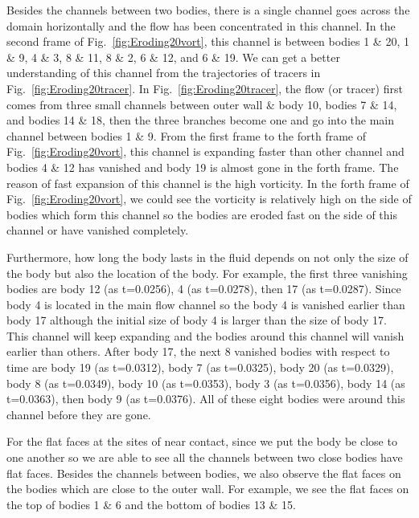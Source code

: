 \documentclass[preprint, 10pt]{elsarticle}
\begin{document}
{\color{red} 
Besides the channels between two bodies, there is a single channel goes
across the domain horizontally and the flow has been concentrated in
this channel.  In the second frame of Fig.~\ref{fig:Eroding20vort}, this
channel is between bodies 1 \& 20, 1 \& 9, 4 \& 3, 8 \& 11, 8 \& 2, 6 \&
12, and 6 \& 19.  We can get a better understanding of this channel from
the trajectories of tracers in Fig.~\ref{fig:Eroding20tracer}.  In Fig.~\ref{fig:Eroding20tracer}, 
the flow (or tracer) first comes from three small channels between outer wall \& body
10, bodies 7 \& 14, and bodies 14 \& 18, then the three branches become
one and go into the main channel between bodies 1 \& 9.  From the first
frame to the forth frame of Fig.~\ref{fig:Eroding20vort}, this channel
is expanding faster than other channel and bodies 4 \& 12 has vanished
and body 19 is almost gone in the forth frame.  The reason of fast
expansion of this channel is the high vorticity.  In the forth frame of
Fig.~\ref{fig:Eroding20vort}, we could see the vorticity is relatively
high on the side of bodies which form this channel so the bodies are
eroded fast on the side of this channel or have vanished completely.

Furthermore, how long the body lasts in the fluid depends on not only the size of
the body but also the location of the body.  For example, the first
three vanishing bodies are body 12 (as t=0.0256), 4 (as t=0.0278), then
17 (as t=0.0287).  Since body 4 is located in the main flow channel so
the body 4 is vanished earlier than body 17 although the initial size of
body 4 is larger than the size of body 17.  This channel will keep
expanding and the bodies around this channel will vanish earlier than
others.  After body 17, the next 8 vanished bodies with respect to time
are body 19 (as t=0.0312),  body 7 (as t=0.0325), body 20 (as t=0.0329),
body 8 (as t=0.0349), body 10 (as t=0.0353), body 3 (as t=0.0356), body
14 (as t=0.0363), then body 9 (as t=0.0376).  All of these eight bodies
were around this channel before they are gone.

For the flat faces at the sites of near contact, since we put the body
be close to one another so we are able to see all the channels between
two close bodies have flat faces.  Besides the channels between bodies,
we also observe the flat faces on the bodies which are close to the
outer wall. For example, we see the flat faces on the top of bodies 1 \&
6 and the bottom of bodies 13 \& 15.  

}
\end{document}
